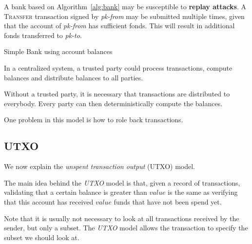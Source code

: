 \noindent
A bank based on Algorithm~\ref{alg:bank} may be susceptible to \textbf{replay attacks}. A \textsc{Transfer} transaction signed by \textit{pk-from} may be submitted multiple times, given that the account of \textit{pk-from} has sufficient fonds. This will result in additional fonds transferred to \textit{pk-to}.

\begin{algorithm}[ht!]
	\caption{Simple Bank using account balances}
	\label{alg:bank}
	\begin{algorithmic}
			
			
		\EndProcedure
			\EndIf
		\EndProcedure
	\end{algorithmic}
\end{algorithm}


\begin{note}
In a centralized system, a trusted party could process transactions, compute balances and distribute balances to all parties. 

Without a trusted party, it is necessary that transactions are distributed to everybody. Every party can then deterministically compute the balances.

One problem in this model is how to role back transactions.
\end{note}

\subsection{UTXO}
We now explain the \emph{unspent transaction output} (UTXO) model. 

\begin{idea}[UTXO]
The main idea behind the \emph{UTXO} model is that, given a record of transactions, validating that a certain balance is greater than $value$ is the same as verifying that this account has received $value$ funds that have not been spend yet.

Note that it is usually not necessary to look at all transactions received by the sender, but only a subset. The \emph{UTXO} model allows the transaction to specify the subset we should look at.
\end{idea}

